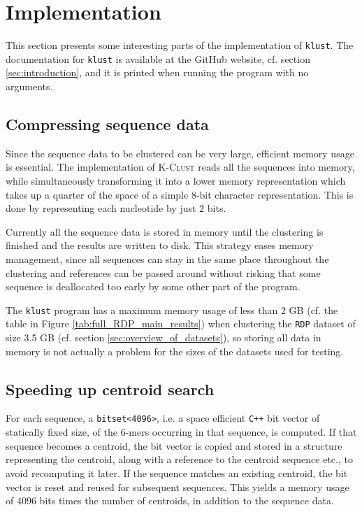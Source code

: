 \section{Implementation} \label{sec:implementation}

This section presents some interesting parts of the implementation of
\texttt{klust}. The documentation for \texttt{klust} is available at the GitHub
website, cf.  section \ref{sec:introduction}, and it is printed when running
the program with no arguments.


\subsection{Compressing sequence data}

Since the sequence data to be clustered can be very large, efficient memory
usage is essential. The implementation of \textsc{K-Clust} reads all the
sequences into memory, while simultaneously transforming it into a lower memory
representation which takes up a quarter of the space of a simple 8-bit
character representation. This is done by representing each nucleotide by just
2 bits.

Currently all the sequence data is stored in memory until the clustering is
finished and the results are written to disk. This strategy eases memory
management, since all sequences can stay in the same place throughout the
clustering and references can be passed around without risking that some
sequence is deallocated too early by some other part of the program.

The \texttt{klust} program has a maximum memory usage of less than 2 GB (cf.
the table in Figure \ref{tab:full_RDP_main_results}) when clustering the
\texttt{RDP} dataset of size 3.5 GB (cf. section
\ref{sec:overview_of_datasets}), so storing all data in memory is not actually
a problem for the sizes of the datasets used for testing.


\subsection{Speeding up centroid search}

For each sequence, a \verb|bitset<4096>|, i.e. a space efficient \texttt{C++}
bit vector of statically fixed size, of the $6$-mers occurring in that
sequence, is computed. If that sequence becomes a centroid, the bit vector is
copied and stored in a structure representing the centroid, along with a
reference to the centroid sequence etc., to avoid recomputing it later. If the
sequence matches an existing centroid, the bit vector is reset and reused for
subsequent sequences. This yields a memory usage of 4096 bits times the number
of centroids, in addition to the sequence data.

